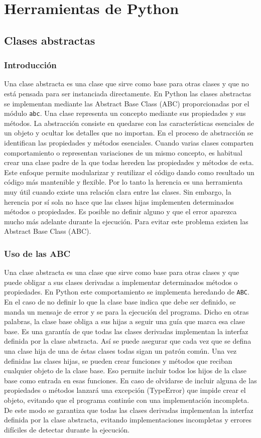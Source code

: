 \documentclass[11pt,a5paper,twoside]{book}
\begin{document}
\newpage


\chapter{Herramientas de Python}

\section{Clases abstractas}
\subsection{Introducción}
Una clase abstracta es una clase que sirve como base para otras clases y que no está pensada para ser instanciada directamente. En Python las clases abstractas se implementan mediante las Abstract Base Class (ABC) proporcionadas por el módulo {\scriptsize \texttt{abc}}.
Una clase representa un concepto mediante sus propiedades y sus métodos. La abstracción consiste en quedarse con las características esenciales de un objeto y ocultar los detalles que no importan. En el proceso de abstracción se identifican las propiedades y métodos esenciales.
Cuando varias clases comparten comportamiento o representan variaciones de un mismo concepto, es habitual crear una clase padre de la que todas hereden las propiedades y métodos de esta.
Este enfoque permite modularizar y reutilizar el código dando como resultado un código más mantenible y flexible. Por lo tanto la herencia es una herramienta muy útil cuando existe una relación clara entre las clases.
Sin embargo, la herencia por sí sola no hace que las clases hijas implementen determinados métodos o propiedades. Es posible no definir alguno y que el error aparezca mucho más adelante durante la ejecución. Para evitar este problema existen las Abstract Base Class (ABC).
\subsection{Uso de las ABC}
Una clase abstracta es una clase que sirve como base para otras clases y que puede obligar a sus clases derivadas a implementar determinados métodos o propiedades. En Python este comportamiento se implementa heredando de {\scriptsize \texttt{ABC}}. En el caso de no definir lo que la clase base indica que debe ser definido, se manda un mensaje de error y se para la ejecución del programa.
Dicho en otras palabras, la clase base obliga a sus hijas a seguir una guía que marca esa clase base. Es una garantía de que todas las clases derivadas implementan la interfaz definida por la clase abstracta. Así se puede asegurar que cada vez que se defina una clase hija de una de éstas clases todas sigan un patrón común.
Una vez definidas las clases hijas, se pueden crear funciones y métodos que reciban cualquier objeto de la clase base. Eso permite incluir todos los hijos de la clase base como entrada en esas funciones.
En caso de olvidarse de incluir alguna de las propiedades o métodos lanzará una excepción (TypeError) que impide crear el objeto, evitando que el programa continúe con una implementación incompleta. De este modo se garantiza que todas las clases derivadas implementan la interfaz definida por la clase abstracta, evitando implementaciones incompletas y errores difíciles de detectar durante la ejecución.
\end{document}
